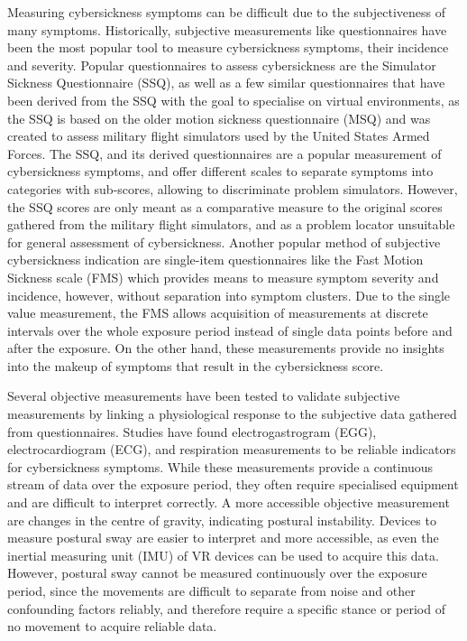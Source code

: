 Measuring cybersickness symptoms can be difficult due to the subjectiveness of many symptoms.
Historically, subjective measurements like questionnaires have been the most popular tool to measure cybersickness
symptoms, their incidence and severity.
Popular questionnaires to assess cybersickness are the Simulator Sickness Questionnaire (SSQ), as well as a few
similar questionnaires that have been derived from the SSQ with the goal to specialise on virtual environments, as
the SSQ is based on the older motion sickness questionnaire (MSQ) and was created to assess military flight
simulators used by the United States Armed Forces.
The SSQ, and its derived questionnaires are a popular measurement of cybersickness symptoms, and offer different
scales to separate symptoms into categories with sub-scores, allowing to discriminate problem simulators.
However, the SSQ scores are only meant as a comparative measure to the original scores gathered from the military
flight simulators, and as a problem locator unsuitable for general assessment of cybersickness.
Another popular method of subjective cybersickness indication are single-item questionnaires like the Fast Motion
Sickness scale (FMS) which provides means to measure symptom severity and incidence, however, without separation into
symptom clusters.
Due to the single value measurement, the FMS allows acquisition of measurements at discrete intervals over the whole
exposure period instead of single data points before and after the exposure.
On the other hand, these measurements provide no insights into the makeup of symptoms that result in the
cybersickness score.

Several objective measurements have been tested to validate subjective measurements by linking a physiological
response to the subjective data gathered from questionnaires.
Studies have found electrogastrogram (EGG), electrocardiogram (ECG), and respiration measurements to be reliable
indicators for cybersickness symptoms.
While these measurements provide a continuous stream of data over the exposure period, they often require specialised
equipment and are difficult to interpret correctly.
A more accessible objective measurement are changes in the centre of gravity, indicating postural instability.
Devices to measure postural sway are easier to interpret and more accessible, as even the inertial measuring unit
(IMU) of VR devices can be used to acquire this data.
However, postural sway cannot be measured continuously over the exposure period, since the movements are difficult to
separate from noise and other confounding factors reliably, and therefore require a specific stance or period of no
movement to acquire reliable data.

